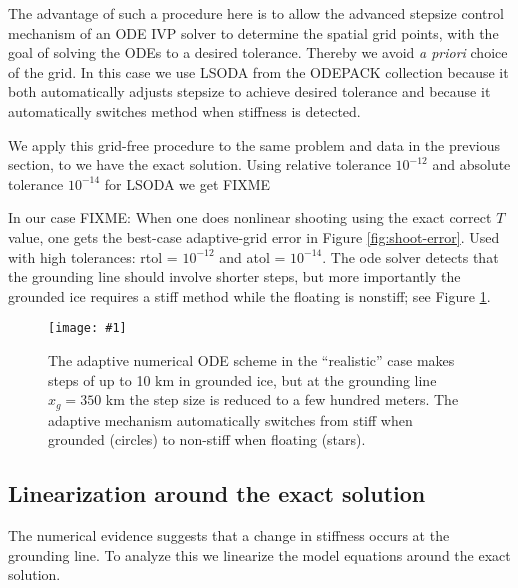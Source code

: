 \documentclass[review,letterpaper]{igs}
\newcommand{\onecol}[1]{\texttt{[image: \#1]}}
\begin{document}
The advantage of such a procedure here is to allow the advanced stepsize control mechanism of an ODE IVP solver to determine the spatial grid points, with the goal of solving the ODEs to a desired tolerance.  Thereby we avoid \emph{a priori} choice of the grid.  In this case we use LSODA from the ODEPACK collection \citep{Hindmarsh1983ODEPACK} because it both automatically adjusts stepsize to achieve desired tolerance and because it automatically switches method when stiffness \citep[section 16.6]{Pressetal} is detected.

We apply this grid-free procedure to the same problem and data in the previous section, to we have the exact solution.  Using relative tolerance $10^{-12}$ and absolute tolerance $10^{-14}$ for LSODA we get FIXME

  In our case FIXME:  When one does nonlinear shooting using the exact correct $T$ value, one gets the best-case adaptive-grid error in Figure \ref{fig:shoot-error}.  Used with high tolerances: rtol = $10^{-12}$ and atol = $10^{-14}$.  The ode solver detects that the grounding line should involve shorter steps, but more importantly the grounded ice requires a stiff method while the floating is nonstiff; see Figure \ref{fig:shoot-dt-adaptive}.

\begin{figure}[ht]
\onecol{exactmarine-dt-adaptive}
\caption{The adaptive numerical ODE scheme in the ``realistic'' case makes steps of up to 10 km in grounded ice, but at the grounding line $x_g=350$ km the step size is reduced to a few hundred meters.  The adaptive mechanism automatically switches from stiff when grounded (circles) to non-stiff when floating (stars).} \label{fig:shoot-dt-adaptive}
\end{figure}

\newcommand{\tu}{\tilde u}
\newcommand{\tH}{\tilde H}
\newcommand{\tT}{\tilde T}

\subsection*{Linearization around the exact solution}  The numerical evidence suggests that a change in stiffness occurs at the grounding line.  To analyze this we linearize the model equations around the exact solution.
\end{document}
